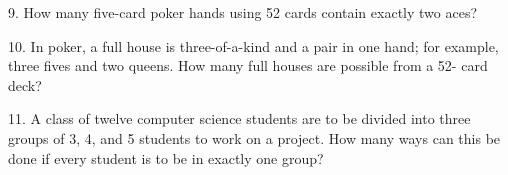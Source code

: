 \documentclass[10pt,]{book}
\theoremstyle{plain}
\theoremstyle{definition}
\begin{document}
\begin{exercisegroup}
\item[9.]\hypertarget{exercise-92}{} How many five-card poker hands using 52 cards contain exactly two aces?\par\smallskip
\item[10.]\hypertarget{exercise-93}{}  In poker, a full house is three-of-a-kind and a pair in one hand; for example, three fives and two queens. How many full houses are possible from a 52- card deck?\par\smallskip
\item[11.]\hypertarget{exercise-94}{} A class of twelve computer science students are to be divided into three groups of 3, 4, and 5 students to work on a project. How many ways can this be done if every student is to be in exactly one group?\par\smallskip
\end{exercisegroup}
\par\smallskip\noindent
\end{document}
